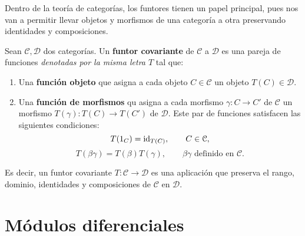Dentro de la teoría de categorías, los funtores tienen un papel principal, pues
nos van a permitir llevar objetos y morfismos de una categoría a otra preservando
identidades y composiciones.

\begin{definicion}
	Sean \(\mathcal{C}, \mathcal{D}\) dos categorías. Un \textbf{funtor covariante} de
	\(\mathcal{C}\) a \(\mathcal{D}\) es una pareja de funciones \textit{denotadas por
		la misma letra \(T\)} tal que:
	\begin{enumerate}
		\item Una \textbf{función objeto} que asigna a cada objeto
		\(C \in \mathcal{C}\) un objeto \(T(C) \in \mathcal{D}\).
		
		\item Una \textbf{función de morfismos} qu asigna a cada morfismo
		\(\gamma: C \rightarrow C'\) de \(\mathcal{C}\) un morfismo
		\(T(\gamma): T(C) \rightarrow T(C')\) de \(\mathcal{D}\). Este par de funciones
		satisfacen las siguientes condiciones:
		\begin{equation}
			T(1_{C}) = \operatorname{id}_{T(C)}, \qquad C \in \mathcal{C},
		\end{equation}
		\begin{equation}
			T(\beta \gamma) = T(\beta)T(\gamma), \qquad \beta \gamma \text{ definido
				en }\mathcal{C}.
		\end{equation}
	\end{enumerate}
\end{definicion}

Es decir, un funtor covariante \(T: \mathcal{C}\rightarrow \mathcal{D}\) es una
aplicación que preserva el rango, dominio, identidades y composiciones de
\(\mathcal{C}\) en \(\mathcal{D}\).

%
\section{Módulos diferenciales}


